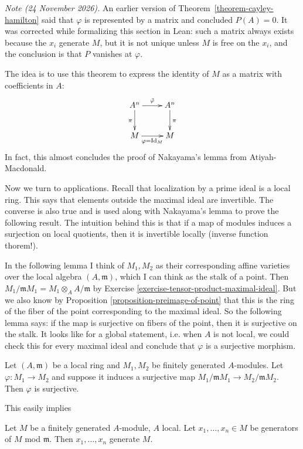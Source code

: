 \medskip\noindent
{\it Note (24 November 2026).}
An earlier version of
Theorem~\ref{theorem-cayley-hamilton}
said that $\varphi$ is represented by
a matrix and concluded $P(A)=0$.
It was corrected while formalizing this
section in Lean: such a matrix always exists
because the $x_i$ generate $M$,
but it is not unique unless
$M$ is free on the $x_i$,
and the conclusion is that $P$ vanishes
at $\varphi$.

\medskip\noindent

The idea is to use this theorem
to express the identity of $M$
as a matrix with coefficients in $A$:
$$
\xymatrix{
A^n\ar[r]^{\tilde{\varphi}}\ar[d]_{\pi}
&A^n\ar[d]^{\pi}\\
M\ar[r]_{\varphi=\text{Id}_M}
&M
}
$$
In fact, this almost concludes the proof
of Nakayama's lemma from Atiyah-Macdonald.

\medskip\noindent
Now we turn to applications.
Recall that localization by a prime ideal
is a local ring. This says that elements
outside the maximal ideal are invertible.
The converse is also true and
is used along with Nakayama's lemma
to prove the following result.
The intuition behind this is that
if a map of modules induces a surjection
on local quotients, then it is invertible
locally (inverse function thorem!).

In the following lemma
I think of $M_1,M_2$ as their
corresponding affine varieties
over the local algebra $(A,\mathfrak{m})$,
which I can think as the stalk of a point.
Then $M_1/\mathfrak{m}M_1
=M_1 \otimes_A A/\mathfrak{m}$
by Exercise
\ref{exercise-tensor-product-maximal-ideal}.
But we also know
by Proposition
\ref{proposition-preimage-of-point}
that this is the ring of the fiber of
the point corresponding to the maximal ideal.
So the following lemma says:
if the map is surjective on fibers
of the point, then it is surjective
on the stalk.
It looks like for a global statement, i.e.
when $A$ is not local,
we could check this for every
maximal ideal and conclude that
$\varphi$ is a surjective morphism.

\begin{lemma}
\label{lemma-localization-nakayama}
Let $(A,\mathfrak{m})$ be a local ring
and $M_1,M_2$ be finitely generated
$A$-modules. Let $\varphi:M_1 \to M_2$
and suppose it induces a surjective map
$M_1/\mathfrak{m}M_1
\to M_2/\mathfrak{m}M_2$.
Then $\varphi$ is surjective.
\end{lemma}

\noindent
This easily implies

\begin{lemma}
\label{lemma-local-modules}
Let $M$ be a finitely generated $A$-module,
$A$ local. Let $x_1,…,x_n \in M$
be generators of $M$ mod $\mathfrak{m}$.
Then $x_1,…,x_n$ generate $M$.
\end{lemma}

